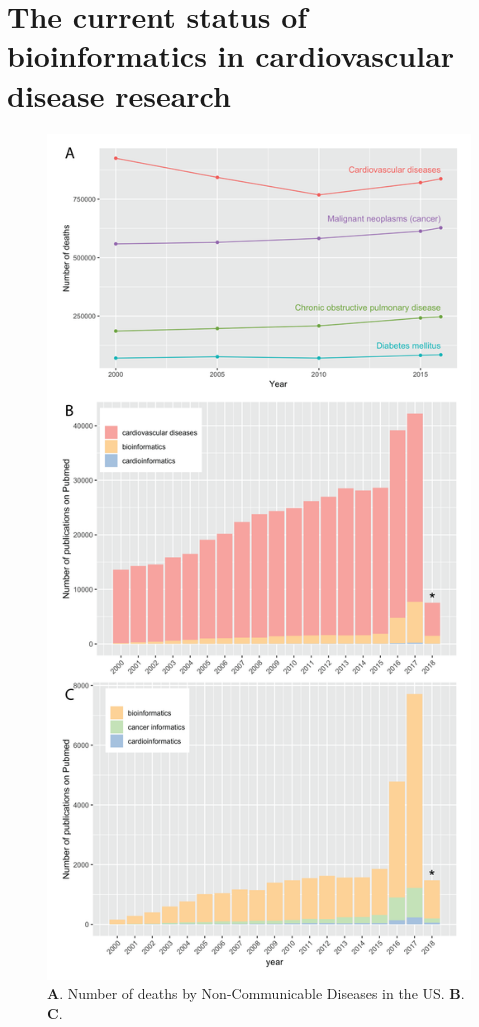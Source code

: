 \documentclass[letter]{bioinfo}
\begin{document}
\section{The current status of bioinformatics in cardiovascular disease research}
\begin{figure}
	\centering
	\includegraphics[width=1\linewidth]{figure1}
	\caption{\textbf{A}. Number of deaths by Non-Communicable Diseases in the US. \textbf{B}. \textbf{C}.}
	\label{fig:figure1}
\end{figure}
\end{document}
